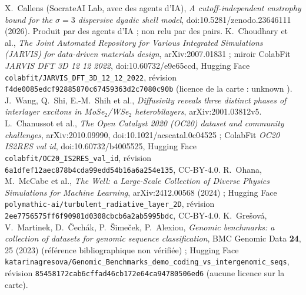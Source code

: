  X.~Callens (SocrateAI Lab, avec des agents d'IA), \emph{A cutoff-independent enstrophy bound for the
$\sigma=3$ dispersive dyadic shell model}, doi:10.5281/zenodo.23646111 (2026). Produit par des agents d'IA ; non relu par des pairs.
 K.~Choudhary et al., \emph{The Joint Automated Repository for Various Integrated Simulations (JARVIS) for
data-driven materials design}, arXiv:2007.01831 ; miroir ColabFit \emph{JARVIS DFT 3D 12 12 2022}, doi:10.60732/e9e65ccd,
Hugging Face \texttt{colabfit/JARVIS\_DFT\_3D\_12\_12\_2022}, révision \texttt{f4de0085edcf92885870c67459363d2c7080c90b}
(licence de la carte : \og unknown \fg).
 J.~Wang, Q.~Shi, E.-M.~Shih et al., \emph{Diffusivity reveals three distinct phases of interlayer excitons
in MoSe$_2$/WSe$_2$ heterobilayers}, arXiv:2001.03812v5.
 L.~Chanussot et al., \emph{The Open Catalyst 2020 (OC20) dataset and community challenges},
arXiv:2010.09990, doi:10.1021/acscatal.0c04525 ; ColabFit \emph{OC20 IS2RES val id}, doi:10.60732/b4005525,
Hugging Face \texttt{colabfit/OC20\_IS2RES\_val\_id}, révision \texttt{6a1dfef12aec878b4cda99edd54b16a6a254e135},
CC-BY-4.0.
 R.~Ohana, M.~McCabe et al., \emph{The Well: a Large-Scale Collection of Diverse Physics Simulations for
Machine Learning}, arXiv:2412.00568 (2024) ; Hugging Face \texttt{polymathic-ai/turbulent\_radiative\_layer\_2D}, révision
\texttt{2ee7756575ff6f90981d0308cbcb6a2ab5995bdc}, CC-BY-4.0.
 K.~Grešová, V.~Martinek, D.~Čechák, P.~Šimeček, P.~Alexiou, \emph{Genomic benchmarks: a collection of
datasets for genomic sequence classification}, BMC Genomic Data \textbf{24}, 25 (2023) (référence bibliographique non vérifiée) ; Hugging Face
\texttt{katarinagresova/Genomic\_Benchmarks\_demo\_coding\_vs\_intergenomic\_seqs}, révision
\texttt{85458172cab6cffad46cb172e64ca94780506ed6} (aucune licence sur la carte).
